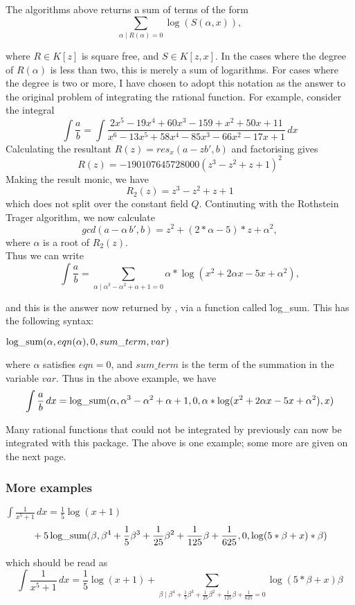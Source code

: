 \hypertarget{operator:LOG_SUM}{}
The algorithms above returns a sum of terms of the form
\[ \sum_{\alpha \mid R(\alpha)=0} \log(S(\alpha,x)), \]

where $R \in K[z]$ is square free, and $S \in K[z,x]$. In the cases where the degree of $R(\alpha)$ is less than two, this is merely a sum of logarithms. For cases where the degree is two or more, I have chosen to adopt this notation as the answer to the original problem of integrating the rational function. For example,
consider the integral
 \[ \int \frac{a}{b}=\int \frac{2x^5-19x^4+60x^3-159+x^2+50x+11}{x^6-13x^5+58x^4-85x^3-66x^2-17x+1}\, dx \]
Calculating the resultant $R(z)=res_x(a-zb',b)$ and factorising gives
  \[ R(z)=-190107645728000(z^3-z^2+z+1)^{2} \]
Making the result monic, we have
\[ R_2(z)=z^3-z^2+z+1 \]
which does not split over the constant field $Q$.
Continuting with the Rothstein Trager algorithm, we now calculate
\[ gcd(a-\alpha\,b',b)=z^2+(2*\alpha-5)*z+\alpha^2, \] where $\alpha$ is a root of $R_2(z)$. \\
Thus we can write
\[ \int \frac{a}{b}= \sum_{\alpha \mid \alpha^3-\alpha^2+\alpha+1=0} \alpha*\log(x^2+2\alpha x-5x+\alpha^2), \]

and this is the answer now returned by \REDUCE, via a function called \f{log\_sum}. This has the following syntax:
\begin{center}$ \mathop{\mathrm{log\_sum}}(\alpha,eqn(\alpha),0,sum\_term,var)$ \end{center}
where $\alpha$ satisfies $eqn=0$, and $sum\_term$ is the term of the summation in the variable $var$. Thus in the above example, we have
\[ \int \frac{a}{b}\,dx= \mathop{\mathrm{log\_sum}}(\alpha,\alpha^3-\alpha^2+\alpha+1,0,\alpha*\log(x^2+2\alpha x-5x+\alpha^2),x) \]

Many rational functions that could not be integrated by \REDUCE previously can now be integrated with this package. The above is one example; some more are given on the next page.

\subsubsection{More examples}
\(
\displaystyle \int \frac{1}{x^5+1} \, dx = \frac{1}{5}\log(x + 1)
\)
\[
\mbox{} + 5 \mathop{\mathrm{log\_sum}}(\beta,\beta^4+\frac{1}{5}\beta^3+\frac{1}{25}\beta^2+\frac{1}{125}\beta+\frac{1}{625},0,\log(5*\beta+x)*\beta)
\]

which should be read as
\[
\int \frac{1}{x^5+1}\,dx = \frac{1}{5}\log(x+1)+\sum_{\beta \mid\beta^4+\frac{1}{5}\beta^3+\frac{1}{25}\beta^2+\frac{1}{125}\beta+\frac{1}{625}=0}\log(5*\beta+x)\beta
\]

